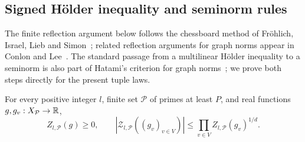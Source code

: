 \subsection{Signed H\"older inequality and seminorm rules}

The finite reflection argument below follows the chessboard method of
Fr\"ohlich, Israel, Lieb and Simon~\cite[Theorem~4.1]{FILS1978};
related reflection arguments for graph norms appear in Conlon and
Lee~\cite[Section~3]{ConlonLee2017}.
The standard passage from a multilinear H\"older inequality to a seminorm
is also part of Hatami's criterion for graph norms~\cite[Theorem~2.8 of
the arXiv version]{Hatami2010}; we prove both steps directly for the
present tuple laws.

\begin{proposition}
\label{prop:signed-holder}
For every positive integer \(l\), finite set \(\mathcal P\) of primes
at least \(P\), and real functions \(g,g_v:X_{\mathcal P}\to\mathbb R\),
\begin{equation}
 Z_{l,\mathcal P}(g)\ge0,
 \qquad
 \left|\mathcal Z_{l,\mathcal P}((g_v)_{v\in V})\right|
 \le\prod_{v\in V} Z_{l,\mathcal P}(g_v)^{1/d}.
 \label{eq:signed-holder}
\end{equation}
\end{proposition}

